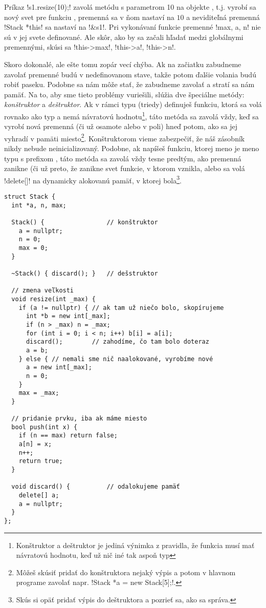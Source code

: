 Príkaz \prg!s1.resize(10);! zavolá metódu  s parametrom 10 na objekte ,
t.j. vyrobí sa nový svet pre funkciu , 
premenná  sa v ňom nastaví na $10$ a 
neviditeľná premenná \prg!Stack *this! sa nastaví na \prg!&s1!. Pri vykonávaní funkcie
premenné \prg!max, a, n! nie sú v jej svete definované.  Ale skôr, ako by sa 
začali hľadať medzi globálnymi premennými, skúsi sa
\prg!this->max!, \prg!this->a!, \prg!this->n!. 


Skoro dokonalé, ale ešte tomu zopár vecí chýba. Ak na začiatku zabudneme zavolať 
premenné  budú v nedefinovanom stave, takže potom ďalšie volania budú
robiť paseku. Podobne sa nám môže stať, že zabudneme zavolať  a stratí sa nám
pamäť. Na to, aby sme tieto problémy vuriešili, slúžia dve špeciálne metódy: {\em konštruktor}
a {\em deštruktor}. Ak v rámci typu (triedy) definuješ funkciu, ktorá sa volá rovnako ako
typ a nemá návratovú hodnotu\footnote{Konštruktor a deštruktor je jediná výnimka z pravidla,
že funkcia musí mať návratovú hodnotu, keď už nič iné tak aspoň typ }, táto metóda
sa zavolá vždy, keď sa vyrobí nová premenná (či už osamote alebo v poli) hneď potom, ako
sa jej vyhradí v pamäti miesto\footnote{Môžeš skúsiť pridať do konštruktora nejaký výpis
a potom v hlavnom programe zavolať napr. \prg!Stack *a = new Stack[5];!.}. Konštruktorom
vieme zabezpečiť, že náš zásobník nikdy nebude neinicializovaný. Podobne, ak napíšeš
funkciu, ktorej meno je meno typu s prefixom \vb{\textasciitilde}, táto metóda
sa zavolá vždy tesne predtým, ako premenná zanikne (či už preto, že zanikne svet funkcie,
v ktorom vznikla, alebo sa volá \prg!delete[]! na dynamicky alokovanú pamäť, v ktorej 
bola\footnote{%
  Skús si opäť pridať výpis do deštruktora a pozrieť sa, ako sa správa.}.


\begin{lstlisting}[] 
struct Stack {
  int *a, n, max;
  
  Stack() {                 // konštruktor
    a = nullptr;
    n = 0;
    max = 0;
  }

  ~Stack() { discard(); }   // dešstruktor
  
  // zmena veľkosti
  void resize(int _max) {  
    if (a != nullptr) { // ak tam už niečo bolo, skopírujeme
      int *b = new int[_max];
      if (n > _max) n = _max;
      for (int i = 0; i < n; i++) b[i] = a[i];
      discard();        // zahodíme, čo tam bolo doteraz
      a = b; 
    } else { // nemali sme nič naalokované, vyrobíme nové
      a = new int[_max];
      n = 0;
    }
    max = _max;
  } 
  
  // pridanie prvku, iba ak máme miesto
  bool push(int x) {
    if (n == max) return false;
    a[n] = x;
    n++;
    return true;
  } 
  
  void discard() {          // odalokujeme pamäť
    delete[] a;
    a = nullptr;
  } 
};
\end{lstlisting}

